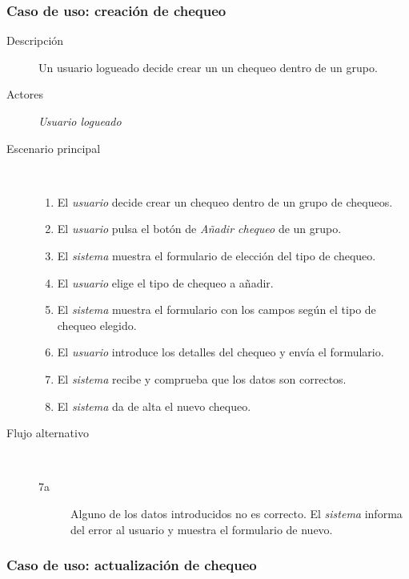 \subsubsection{Caso de uso: creación de chequeo}

\begin{description}
\item[Descripción] Un usuario logueado decide crear un un chequeo dentro de un grupo.
\item[Actores] \textit{Usuario logueado}
\item[Escenario principal] $\quad$
  \begin{enumerate}
  \item El \textit{usuario} decide crear un chequeo dentro de un grupo de chequeos.
  \item El \textit{usuario} pulsa el botón de \textit{Añadir chequeo} de un grupo.
  \item El \textit{sistema} muestra el formulario de elección del tipo de chequeo.
  \item El \textit{usuario} elige el tipo de chequeo a añadir.
  \item El \textit{sistema} muestra el formulario con los campos según el tipo de chequeo elegido.
  \item El \textit{usuario} introduce los detalles del chequeo y envía el formulario.
  \item El \textit{sistema} recibe y comprueba que los datos son correctos.
  \item El \textit{sistema} da de alta el nuevo chequeo.
  \end{enumerate}
\item[Flujo alternativo] $\quad$
  \begin{description}
  \item[7a] Alguno de los datos introducidos no es correcto. El \textit{sistema}
    informa del error al usuario y muestra el formulario de nuevo.
  \end{description}
\end{description}


\subsubsection{Caso de uso: actualización de chequeo}

